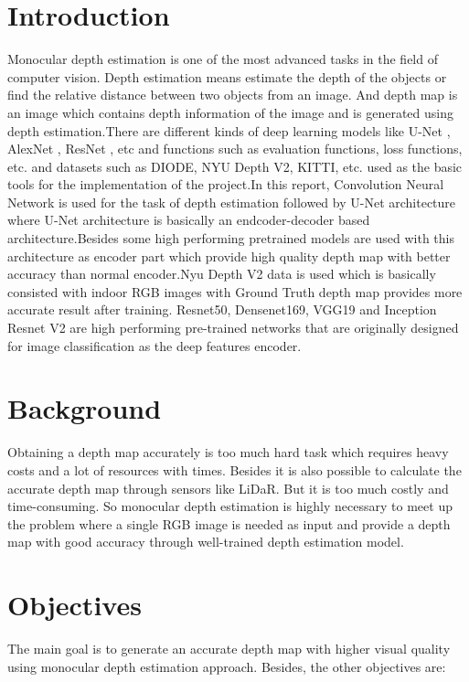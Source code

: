 \documentclass[a4paper,12pt,oneside]{book}
\begin{document}
\section{Introduction}\label{sec:intro}
Monocular depth estimation is one of the most advanced tasks in the field of computer vision. Depth estimation means estimate the depth of the objects or find the relative distance between two objects from an image. And depth map is an image which contains depth information of the image and is generated using depth estimation.There are different kinds of deep learning models like U-Net \cite{unetwotk}, AlexNet \cite{alexnetwork}, ResNet \cite{resnetwork}, etc and functions such as evaluation functions, loss functions, etc. and datasets such as DIODE, NYU Depth V2, KITTI, etc. used as the basic tools for the implementation of the project.In this report, Convolution Neural Network is used for the task of depth estimation followed by U-Net architecture where U-Net architecture is basically an endcoder-decoder based architecture.Besides some high performing pretrained models are used with this architecture as encoder part which provide high quality depth map with better accuracy than normal encoder.Nyu Depth V2 data is used which is basically consisted with indoor RGB images with Ground Truth depth map provides more accurate result after training. Resnet50, Densenet169, VGG19 and Inception Resnet V2 are high performing pre-trained networks that are originally designed for image classification as the deep features encoder.
\section{Background}\label{sec:backg}
Obtaining a depth map accurately is too much hard task which requires heavy costs and a lot of resources with times. Besides it is also possible to calculate the accurate depth map through sensors like LiDaR. But it is too much costly and time-consuming. So monocular depth
estimation is highly necessary to meet up the problem where a single RGB image is needed as input and provide a depth map with good accuracy through well-trained depth estimation model.

\section{Objectives}
The main goal is to generate an accurate depth map with higher visual quality using monocular depth estimation approach. Besides, the other objectives are:
\end{document}
